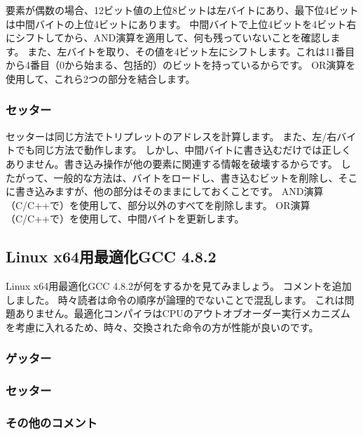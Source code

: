 要素が偶数の場合、12ビット値の上位8ビットは左バイトにあり、最下位4ビットは中間バイトの上位4ビットにあります。
中間バイトで上位4ビットを4ビット右にシフトしてから、AND演算を適用して、何も残っていないことを確認します。
また、左バイトを取り、その値を4ビット左にシフトします。これは11番目から4番目（0から始まる、包括的）のビットを持っているからです。
OR演算を使用して、これら2つの部分を結合します。

\subsubsection{セッター}

セッターは同じ方法でトリプレットのアドレスを計算します。
また、左/右バイトでも同じ方法で動作します。
しかし、中間バイトに書き込むだけでは正しくありません。書き込み操作が他の要素に関連する情報を破壊するからです。
したがって、一般的な方法は、バイトをロードし、書き込むビットを削除し、そこに書き込みますが、他の部分はそのままにしておくことです。
AND演算（C/C++で\TT{\&}）を使用して、部分以外のすべてを削除します。
OR演算（C/C++で\TT{|}）を使用して、中間バイトを更新します。

\subsection{Linux x64用最適化GCC 4.8.2}

Linux x64用最適化GCC 4.8.2が何をするかを見てみましょう。
コメントを追加しました。
時々読者は命令の順序が論理的でないことで混乱します。
これは問題ありません。最適化コンパイラはCPUのアウトオブオーダー実行メカニズムを考慮に入れるため、時々、交換された命令の方が性能が良いのです。

\subsubsection{ゲッター}



\subsubsection{セッター}



\subsubsection{その他のコメント}

